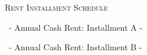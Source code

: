 
\textsc{Rent Installment Schedule}

\vspace{1cm}

\rentinstallmentdatesdateOne\ - Annual Cash Rent: Installment A - \installmentA

\blankspace

\rentinstallmentdatesdateTwo\ - Annual Cash Rent: Installment B - \installmentB
